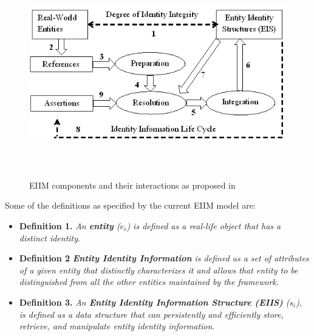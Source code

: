 \begin{figure}[htbp]
  \caption{EIIM components and their interactions as proposed in \cite{zhou2011entity}}
\label{originalEIIM}
  \centering
    \includegraphics[width=15cm,height=9cm]{Figures/originalEIIM.jpg}
\end{figure}

Some of the definitions as specified by the current EIIM model are:

\begin{itemize}
\item \textbf{Definition 1.} \textit{An \textbf{entity} (\textbf{$e_{i}$}) is defined as a real-life object that has a distinct identity}.

\item \textbf{Definition 2} \textit{\textbf{Entity Identity Information} is defined as a set of attributes of a given entity that distinctly characterizes it and allows that entity to be distinguished from all the other entities maintained by the framework.}

\item \textbf{Definition 3.} \textit{An \textbf{Entity Identity Information Structure (EIIS)} (\textbf{$s_{i}$}), is defined as a data structure that can persistently and efficiently store, retrieve, and manipulate entity identity information}.
\end{itemize}







